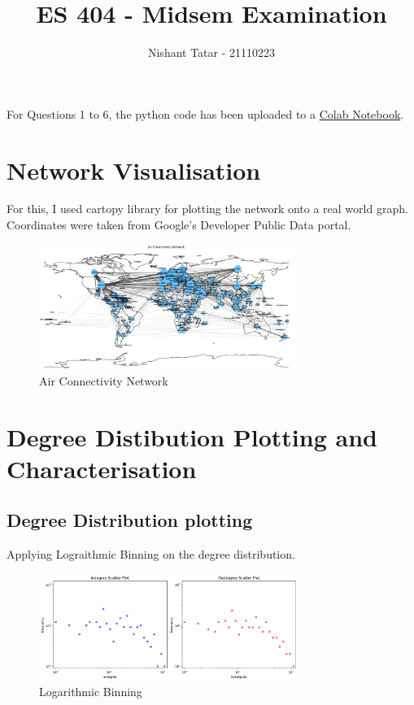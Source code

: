 \documentclass[11pt]{article}
\title{ES 404 - Midsem Examination}
\date{}
\author{Nishant Tatar - 21110223}
\begin{document}
\maketitle

For Questions 1 to 6, the python code has been uploaded to a \href{https://colab.research.google.com/drive/13LGfweQzj7sSejKYgvT02PPBfOn1-AWh?usp=sharing}{Colab Notebook}.

\section{Network Visualisation}
For this, I used cartopy library for plotting the network onto a real world graph. Coordinates were taken from Google's Developer Public Data portal.

\begin{figure}[h]
    \centering
    \includegraphics[width=0.75\textwidth]{geocodenetwork.png} %
    \caption{Air Connectivity Network}
\end{figure}

\section{Degree Distibution Plotting and Characterisation}
\subsection{Degree Distribution plotting}
Applying Lograithmic Binning on the degree distribution.
\begin{figure}[h]
    \centering
    \includegraphics[width=0.75\textwidth]{logbinneddegplot.png} %
    \caption{Logarithmic Binning}
\end{figure}
\end{document}
